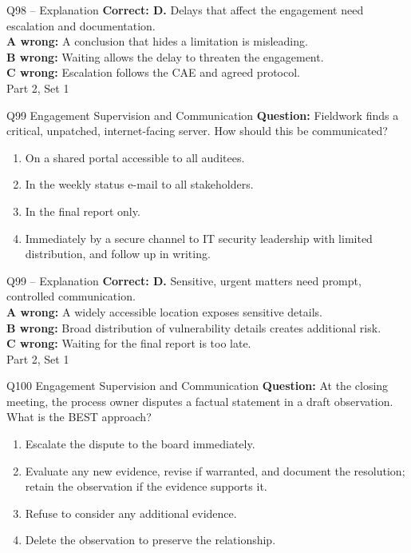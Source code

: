 \documentclass[aspectratio=169,10pt]{beamer}
\begin{document}
\begin{frame}[t]{Q98 -- Explanation}
	\footnotesize
	\textbf{Correct: D.} Delays that affect the engagement need escalation and documentation. \\[5pt]
\textbf{A wrong:} A conclusion that hides a limitation is misleading. \\[3pt]
\textbf{B wrong:} Waiting allows the delay to threaten the engagement. \\[3pt]
\textbf{C wrong:} Escalation follows the CAE and agreed protocol. \\[3pt]
	\vfill {\tiny Part 2, Set 1}
\end{frame}
\begin{frame}[t]{Q99 \hfill {\scriptsize Engagement Supervision and Communication}}
	\small
	\textbf{Question:} Fieldwork finds a critical, unpatched, internet-facing server. How should this be communicated?
	\begin{enumerate}[label=\Alph*.,itemsep=1pt,topsep=3pt]
			\item On a shared portal accessible to all auditees.
			\item In the weekly status e-mail to all stakeholders.
			\item In the final report only.
			\item Immediately by a secure channel to IT security leadership with limited distribution, and follow up in writing.
	\end{enumerate}
\end{frame}
\begin{frame}[t]{Q99 -- Explanation}
	\footnotesize
	\textbf{Correct: D.} Sensitive, urgent matters need prompt, controlled communication. \\[5pt]
\textbf{A wrong:} A widely accessible location exposes sensitive details. \\[3pt]
\textbf{B wrong:} Broad distribution of vulnerability details creates additional risk. \\[3pt]
\textbf{C wrong:} Waiting for the final report is too late. \\[3pt]
	\vfill {\tiny Part 2, Set 1}
\end{frame}
\begin{frame}[t]{Q100 \hfill {\scriptsize Engagement Supervision and Communication}}
	\small
	\textbf{Question:} At the closing meeting, the process owner disputes a factual statement in a draft observation. What is the BEST approach?
	\begin{enumerate}[label=\Alph*.,itemsep=1pt,topsep=3pt]
			\item Escalate the dispute to the board immediately.
			\item Evaluate any new evidence, revise if warranted, and document the resolution; retain the observation if the evidence supports it.
			\item Refuse to consider any additional evidence.
			\item Delete the observation to preserve the relationship.
	\end{enumerate}
\end{frame}
\end{document}
